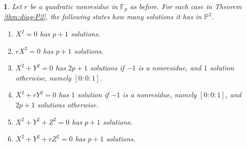 \documentclass[10pt,a4paper]{amsart}
\numberwithin{equation}{section}
\numberwithin{figure}{section}
\theoremstyle{definition}
\theoremstyle{remark}
\theoremstyle{plain}
\theoremstyle{plain}
\theoremstyle{definition}
\theoremstyle{plain}
\newtheorem{prop}{\protect\propositionname}[section]
\theoremstyle{plain}
\providecommand{\propositionname}{Proposition}
\renewcommand{\P}{\mathbb{P}}
\newcommand{\F}{\mathbb{F}}
\begin{document}
	\begin{prop}\label{prop:counting-P2-solutions}
		Let $r$ be a quadratic nonresidue in $\F_p$ as before. For each case in Theorem \ref{thm:diag-P2}, the following states how many solutions it has in $\P^2$. 
		\begin{enumerate} 
			\item\label{case:rank1_x^2=0} $X^2 = 0$ has $p+1$ solutions.
			\item\label{case:rank1_rx^2=0} $rX^2 = 0$ has $p+1$ solutions.
			\item\label{case:rank2_x^2+y^2=0} $X^2 + Y^2 = 0$ has $2p+1$ solutions if $-1$ is a nonresidue, and $1$ solution otherwise, namely $[0:0:1]$.
			\item\label{case:rank2_x^2+ry^2=0} $X^2 + rY^2 = 0$ has $1$ solution if $-1$ is a nonresidue, namely $[0:0:1]$, and $2p+1$ solutions otherwise.
			\item\label{case:rank3_x^2+y^2+z^2=0} $X^2 + Y^2 + Z^2 = 0$ has $p+1$ solutions.
			\item\label{case:rank3_x^2+y^2+rz^2=0} $X^2 + Y^2 + rZ^2 = 0$ has $p+1$ solutions.
		\end{enumerate}
	\end{prop}
\end{document}
